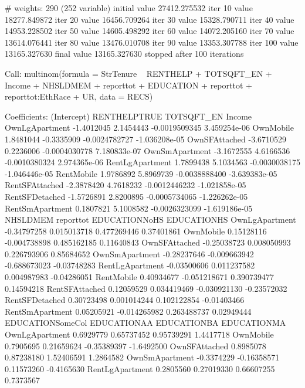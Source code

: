 \documentclass{article}
\begin{document}
\begin{Schunk}
\begin{Soutput}
# weights:  290 (252 variable)
initial  value 27412.275532 
iter  10 value 18277.849872
iter  20 value 16456.709264
iter  30 value 15328.790711
iter  40 value 14953.228502
iter  50 value 14605.498292
iter  60 value 14072.205160
iter  70 value 13614.076441
iter  80 value 13476.010708
iter  90 value 13353.307788
iter 100 value 13165.327630
final  value 13165.327630 
stopped after 100 iterations
\end{Soutput}
\begin{Soutput}
Call:
multinom(formula = StrTenure ~ RENTHELP + TOTSQFT_EN + Income + 
    NHSLDMEM + reporttot + EDUCATION + reporttot + reporttot:EthRace + 
    UR, data = RECS)

Coefficients:
                (Intercept) RENTHELPTRUE    TOTSQFT_EN        Income
OwnLgApartment   -1.4012045    2.1454443 -0.0019509345  3.459254e-06
OwnMobile         1.8481044   -0.3335909 -0.0024782727 -1.036208e-05
OwnSFAttached    -3.6710529    0.2236006 -0.0004030778  7.180833e-07
OwnSmApartment   -3.1672555    4.6166536 -0.0010380324  2.974365e-06
RentLgApartment   1.7899438    5.1034563 -0.0030038175 -1.046446e-05
RentMobile        1.9786892    5.8969739 -0.0038888400 -3.639383e-05
RentSFAttached   -2.3878420    4.7618232 -0.0012446232 -1.021858e-05
RentSFDetached   -1.5726891    2.8200895 -0.0005734065 -1.226262e-05
RentSmApartment   0.1807821    5.1008582 -0.0026323099 -1.619186e-05
                   NHSLDMEM    reporttot EDUCATIONNoHS EDUCATIONHS
OwnLgApartment  -0.34797258  0.015013718   0.477269446  0.37401861
OwnMobile        0.15128116 -0.004738898   0.485162185  0.11640843
OwnSFAttached   -0.25038723  0.008050993   0.226793906  0.85684652
OwnSmApartment  -0.28237646 -0.009663942  -0.688673023 -0.03748283
RentLgApartment -0.03500606  0.011237582   0.004987983 -0.04286051
RentMobile       0.40934677 -0.051218671   0.390739477  0.14594218
RentSFAttached   0.12059529  0.034419469  -0.030921130 -0.23572032
RentSFDetached   0.30723498  0.001014244   0.102122854 -0.01403466
RentSmApartment  0.05205921 -0.014265982   0.263488737  0.02949444
                EDUCATIONSomeCol EDUCATIONAA EDUCATIONBA EDUCATIONMA
OwnLgApartment         0.6929779  0.65737452  0.95739291   1.4417718
OwnMobile              0.7905695  0.21659624 -0.35389397  -1.6492500
OwnSFAttached          0.8985078  0.87238180  1.52406591   1.2864582
OwnSmApartment        -0.3374229 -0.16358571  0.11573260  -0.4165630
RentLgApartment        0.2805560  0.27019330  0.66607255   0.7373567

\end{Soutput}
\end{Schunk}
\end{document}
